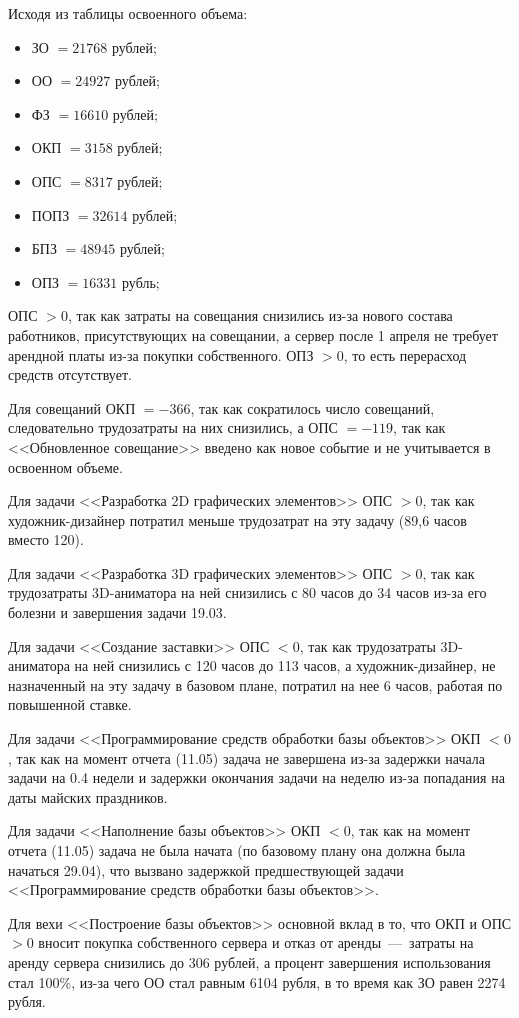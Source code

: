 Исходя из таблицы освоенного объема:
\begin{itemize}[]
	\item ЗО $= 21768$ рублей;
	\item ОО $= 24927$ рублей;
	\item ФЗ $= 16610$ рублей;
	\item ОКП $= 3158$ рублей;
	\item ОПС $= 8317$ рублей;
	\item ПОПЗ $= 32614$ рублей;
	\item БПЗ $= 48945$ рублей;
	\item ОПЗ $= 16331$ рубль;
\end{itemize}

ОПС $> 0$, так как затраты на совещания снизились из-за нового состава работников, присутствующих на совещании, а сервер после 1 апреля не требует арендной платы из-за покупки собственного.
ОПЗ $> 0$, то есть перерасход средств отсутствует.

Для совещаний ОКП $= -366$, так как сократилось число совещаний, следовательно трудозатраты на них снизились, а ОПС $= -119$, так как <<Обновленное совещание>> введено как новое событие и не учитывается в освоенном объеме.

Для задачи <<Разработка 2D графических элементов>> ОПС $> 0$, так как художник-дизайнер потратил меньше трудозатрат на эту задачу (89,6 часов вместо 120).

Для задачи <<Разработка 3D графических элементов>> ОПС $> 0$, так как трудозатраты 3D-аниматора на ней снизились с 80 часов до 34 часов из-за его болезни и завершения задачи 19.03.

Для задачи <<Создание заставки>> ОПС $< 0$, так как трудозатраты 3D-аниматора на ней снизились с 120 часов до 113 часов, а художник-дизайнер, не назначенный на эту задачу в базовом плане, потратил на нее 6 часов, работая по повышенной ставке.

Для задачи <<Программирование средств обработки базы объектов>> ОКП $< 0$, так как на момент отчета (11.05) задача не завершена из-за задержки начала задачи на 0.4 недели и задержки окончания задачи на неделю из-за попадания на даты майских праздников.

Для задачи <<Наполнение базы объектов>> ОКП $< 0$, так как на момент отчета (11.05) задача не была начата (по базовому плану она должна была начаться 29.04), что вызвано задержкой предшествующей задачи <<Программирование средств обработки базы объектов>>.

Для вехи <<Построение базы объектов>> основной вклад в то, что ОКП и ОПС $> 0$ вносит покупка собственного сервера и отказ от аренды~---~затраты на аренду сервера снизились до 306 рублей, а процент завершения использования стал 100\%, из-за чего ОО стал равным 6104 рубля, в то время как ЗО равен 2274 рубля.

